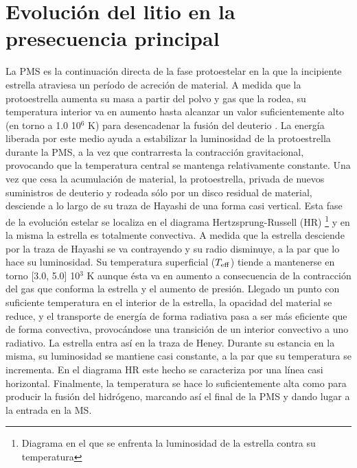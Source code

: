 \section{Evolución del litio en la presecuencia principal}
La PMS es la continuación directa de la fase protoestelar en la que la incipiente estrella atraviesa un período de acreción de material. A medida que la protoestrella aumenta su masa a partir del polvo y gas que la rodea, su temperatura interior va en aumento hasta alcanzar un valor suficientemente alto (en torno a 1.0 10$^{6}$ K) para desencadenar la fusión del deuterio \citep{Stahler1983, Stahler1988}. La energía liberada por este medio ayuda a estabilizar la luminosidad de la protoestrella durante la PMS, a la vez que contrarresta la contracción gravitacional, provocando que la temperatura central se mantenga relativamente constante. Una vez que cesa la acumulación de material, la protoestrella, privada de nuevos suministros de deuterio y rodeada sólo por un disco residual de material, desciende a lo largo de su traza de Hayashi de una forma casi vertical. Esta fase de la evolución estelar se localiza en el diagrama Hertzsprung-Russell (HR) \footnote{Diagrama en el que se enfrenta la luminosidad de la estrella contra su temperatura} y en la misma la estrella es totalmente convectiva. A medida que la estrella desciende por la traza de Hayashi se va contrayendo y su radio disminuye, a la par que lo hace su luminosidad. Su temperatura superficial ($T_{\mathrm{eff}}$) tiende a mantenerse en torno [3.0, 5.0] 10$^{3}$ K aunque ésta va en aumento a consecuencia de la contracción del gas que conforma la estrella y el aumento de presión. Llegado un punto con suficiente temperatura en el interior de la estrella, la opacidad del material se reduce, y el transporte de energía de forma radiativa pasa a ser más eficiente que de forma convectiva, provocándose una transición de un interior convectivo a uno radiativo. La estrella entra así en la traza de Heney. Durante su estancia en la misma, su luminosidad se mantiene casi constante, a la par que su temperatura se incrementa. En el diagrama HR este hecho se caracteriza por una línea casi horizontal. Finalmente, la temperatura se hace lo suficientemente alta como para producir la fusión del hidrógeno, marcando así el final de la PMS y dando lugar a la entrada en la MS. \par

